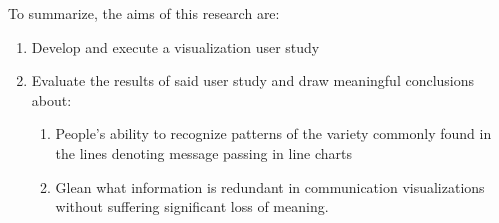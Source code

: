 To summarize, the aims of this research are:
\begin{enumerate}
    \item Develop and execute a visualization user study 
    \item Evaluate the results of said user study and draw meaningful conclusions about:
    \begin{enumerate}
        \item People's ability to recognize patterns of the variety commonly found in the lines denoting message passing in line charts
        \item Glean what information is redundant in communication visualizations without suffering significant loss of meaning.
    \end{enumerate}
\end{enumerate}

